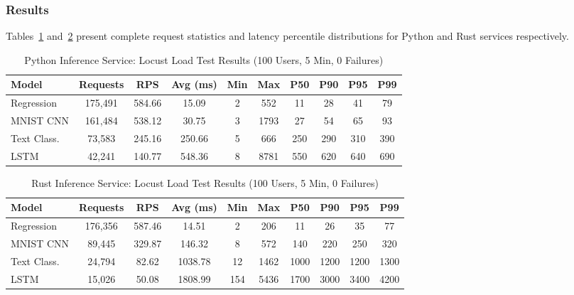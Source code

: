 \documentclass{ieeeaccess}
\begin{document}
\subsubsection{Results}

Tables~\ref{tab:locust_python} and~\ref{tab:locust_rust} present complete request statistics and latency percentile distributions for Python and Rust services respectively.

\begin{table}[t]
\centering
\caption{Python Inference Service: Locust Load Test Results (100 Users, 5 Min, 0 Failures)}
\label{tab:locust_python}
\begin{tabular}{|l|c|c|c|c|c|c|c|c|c|}
\hline
\textbf{Model} & \textbf{Requests} & \textbf{RPS} & \textbf{Avg (ms)} & \textbf{Min} & \textbf{Max} & \textbf{P50} & \textbf{P90} & \textbf{P95} & \textbf{P99} \\
\hline
Regression   & 175,491 & 584.66 & 15.09  & 2   & 552  & 11  & 28  & 41  & 79  \\
MNIST CNN    & 161,484 & 538.12 & 30.75  & 3   & 1793 & 27  & 54  & 65  & 93  \\
Text Class.  & 73,583  & 245.16 & 250.66 & 5   & 666  & 250 & 290 & 310 & 390 \\
LSTM         & 42,241  & 140.77 & 548.36 & 8   & 8781 & 550 & 620 & 640 & 690 \\
\hline
\end{tabular}
\end{table}

\begin{table}[t]
\centering
\caption{Rust Inference Service: Locust Load Test Results (100 Users, 5 Min, 0 Failures)}
\label{tab:locust_rust}
\begin{tabular}{|l|c|c|c|c|c|c|c|c|c|}
\hline
\textbf{Model} & \textbf{Requests} & \textbf{RPS} & \textbf{Avg (ms)} & \textbf{Min} & \textbf{Max} & \textbf{P50} & \textbf{P90} & \textbf{P95} & \textbf{P99} \\
\hline
Regression   & 176,356 & 587.46 & 14.51   & 2   & 206  & 11   & 26   & 35   & 77   \\
MNIST CNN    & 89,445  & 329.87 & 146.32  & 8   & 572  & 140  & 220  & 250  & 320  \\
Text Class.  & 24,794  & 82.62  & 1038.78 & 12  & 1462 & 1000 & 1200 & 1200 & 1300 \\
LSTM         & 15,026  & 50.08  & 1808.99 & 154 & 5436 & 1700 & 3000 & 3400 & 4200 \\
\hline
\end{tabular}
\end{table}
\end{document}
